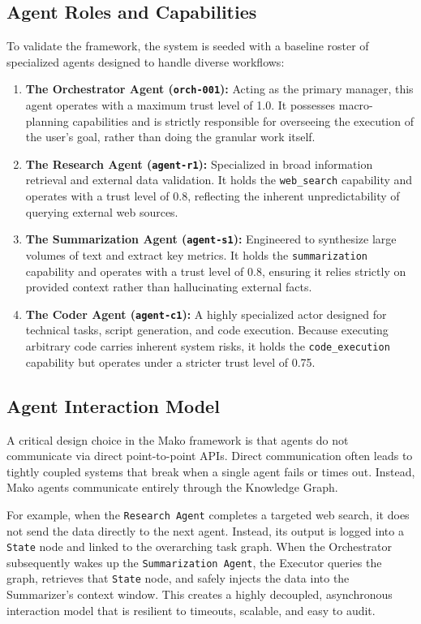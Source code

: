 \subsection{Agent Roles and Capabilities}
To validate the framework, the system is seeded with a baseline roster of specialized agents designed to handle diverse workflows:

\begin{enumerate}
    \item \textbf{The Orchestrator Agent (\texttt{orch-001}):} Acting as the primary manager, this agent operates with a maximum trust level of 1.0. It possesses macro-planning capabilities and is strictly responsible for overseeing the execution of the user's goal, rather than doing the granular work itself.
    \item \textbf{The Research Agent (\texttt{agent-r1}):} Specialized in broad information retrieval and external data validation. It holds the \texttt{web\_search} capability and operates with a trust level of 0.8, reflecting the inherent unpredictability of querying external web sources.
    \item \textbf{The Summarization Agent (\texttt{agent-s1}):} Engineered to synthesize large volumes of text and extract key metrics. It holds the \texttt{summarization} capability and operates with a trust level of 0.8, ensuring it relies strictly on provided context rather than hallucinating external facts.
    \item \textbf{The Coder Agent (\texttt{agent-c1}):} A highly specialized actor designed for technical tasks, script generation, and code execution. Because executing arbitrary code carries inherent system risks, it holds the \texttt{code\_execution} capability but operates under a stricter trust level of 0.75.
\end{enumerate}

\subsection{Agent Interaction Model}
A critical design choice in the Mako framework is that agents do not communicate via direct point-to-point APIs. Direct communication often leads to tightly coupled systems that break when a single agent fails or times out. Instead, Mako agents communicate entirely through the Knowledge Graph.

For example, when the \texttt{Research Agent} completes a targeted web search, it does not send the data directly to the next agent. Instead, its output is logged into a \texttt{State} node and linked to the overarching task graph. When the Orchestrator subsequently wakes up the \texttt{Summarization Agent}, the Executor queries the graph, retrieves that \texttt{State} node, and safely injects the data into the Summarizer's context window. This creates a highly decoupled, asynchronous interaction model that is resilient to timeouts, scalable, and easy to audit.

